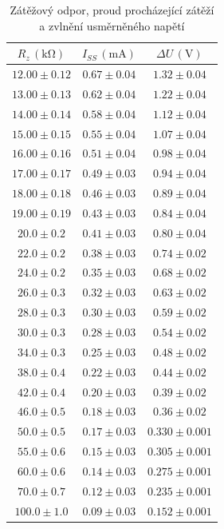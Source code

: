 \documentclass{../concepts/prepareprotokol} %
\begin{document}
\begin{table}[!htbp]
\centering
\caption{Zátěžový odpor, proud procházející zátěží a zvlnění usměrněného napětí}
\begin{tabular}{ccc}
 \toprule
 $R_z\, (\mathrm{k\Omega})$ & $I_{SS}\, (\mathrm{mA})$ & $\Delta U\, (\mathrm{V})$ \\
 \midrule
 $12.00 \pm 0.12$ & $0.67 \pm 0.04$ & $1.32 \pm 0.04$ \\
 $13.00 \pm 0.13$ & $0.62 \pm 0.04$ & $1.22 \pm 0.04$ \\
 $14.00 \pm 0.14$ & $0.58 \pm 0.04$ & $1.12 \pm 0.04$ \\
 $15.00 \pm 0.15$ & $0.55 \pm 0.04$ & $1.07 \pm 0.04$ \\
 $16.00 \pm 0.16$ & $0.51 \pm 0.04$ & $0.98 \pm 0.04$ \\
 $17.00 \pm 0.17$ & $0.49 \pm 0.03$ & $0.94 \pm 0.04$ \\
 $18.00 \pm 0.18$ & $0.46 \pm 0.03$ & $0.89 \pm 0.04$ \\
 $19.00 \pm 0.19$ & $0.43 \pm 0.03$ & $0.84 \pm 0.04$ \\
 $20.0 \pm 0.2$ & $0.41 \pm 0.03$ & $0.80 \pm 0.04$ \\
 $22.0 \pm 0.2$ & $0.38 \pm 0.03$ & $0.74 \pm 0.02$ \\
 $24.0 \pm 0.2$ & $0.35 \pm 0.03$ & $0.68 \pm 0.02$ \\
 $26.0 \pm 0.3$ & $0.32 \pm 0.03$ & $0.63 \pm 0.02$ \\
 $28.0 \pm 0.3$ & $0.30 \pm 0.03$ & $0.59 \pm 0.02$ \\
 $30.0 \pm 0.3$ & $0.28 \pm 0.03$ & $0.54 \pm 0.02$ \\
 $34.0 \pm 0.3$ & $0.25 \pm 0.03$ & $0.48 \pm 0.02$ \\
 $38.0 \pm 0.4$ & $0.22 \pm 0.03$ & $0.44 \pm 0.02$ \\
 $42.0 \pm 0.4$ & $0.20 \pm 0.03$ & $0.39 \pm 0.02$ \\
 $46.0 \pm 0.5$ & $0.18 \pm 0.03$ & $0.36 \pm 0.02$ \\
 $50.0 \pm 0.5$ & $0.17 \pm 0.03$ & $0.330 \pm 0.001$ \\
 $55.0 \pm 0.6$ & $0.15 \pm 0.03$ & $0.305 \pm 0.001$ \\
 $60.0 \pm 0.6$ & $0.14 \pm 0.03$ & $0.275 \pm 0.001$ \\
 $70.0 \pm 0.7$ & $0.12 \pm 0.03$ & $0.235 \pm 0.001$ \\
 $100.0 \pm 1.0$ & $0.09 \pm 0.03$ & $0.152 \pm 0.001$ \\
 \bottomrule
\end{tabular}
\label{tab:2}
\end{table}
\end{document}
